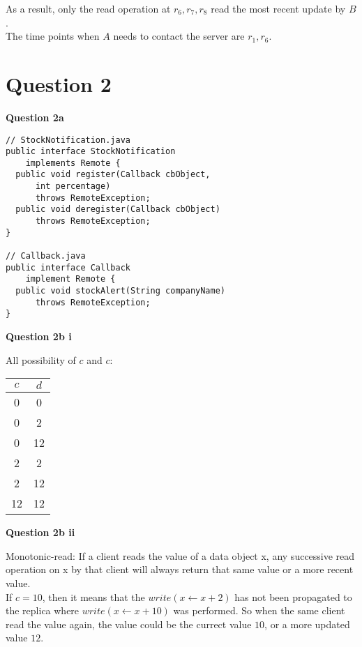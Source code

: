 \documentclass[11pt,a4paper]{report}
\begin{document}
\begin{multicols*}{2}
\noindent As a result, only the read operation at $r_6,r_7,r_8$ read the most recent update by $B$. \\

\noindent The time points when $A$ needs to contact the server are $r_1,r_6$.\\

\section{Question 2}

\noindent \textbf{Question 2a}

\begin{verbatim}
// StockNotification.java
public interface StockNotification 
    implements Remote {
  public void register(Callback cbObject, 
      int percentage) 
      throws RemoteException;
  public void deregister(Callback cbObject) 
      throws RemoteException;
}

// Callback.java
public interface Callback 
    implement Remote {
  public void stockAlert(String companyName) 
      throws RemoteException;
}
\end{verbatim}

\noindent \textbf{Question 2b i}

\noindent All possibility of $c$ and $c$:

\begin{center}
\begin{tabular}{|c|c|}
  \hline
  $c$ & $d$ \\
  \hline
  0  & 0  \\
  0  & 2  \\
  0  & 12 \\
  2  & 2  \\
  2  & 12 \\
  12 & 12 \\ \hline
\end{tabular}
\end{center}

\noindent \textbf{Question 2b ii}

\noindent Monotonic-read: If a client reads the value of a data object x, any successive read operation on x by that client will always return that same value or a more recent value.\\

\noindent If $c=10$, then it means that the $write(x\leftarrow x + 2)$ has not been propagated to the replica where $write(x\leftarrow x + 10)$ was performed. So when the same client read the value again, the value could be the currect value $10$, or a more updated value $12$.


\end{multicols*}
\end{document}
